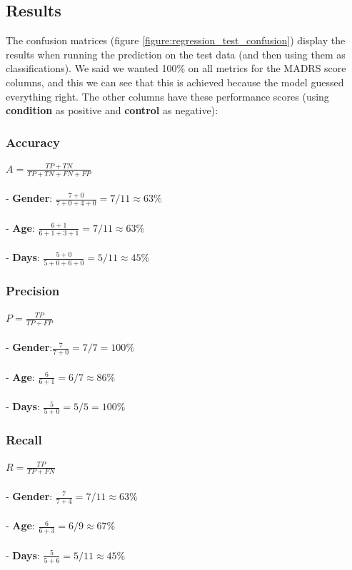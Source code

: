 \subsection{Results}

The confusion matrices (figure \ref{figure:regression_test_confusion}) display the results when running the prediction on the test data (and then using them as classifications). We said we wanted 100\% on all metrics for the MADRS score columns, and this we can see that this is achieved because the model guessed everything right. The other columns have these performance scores (using \textbf{condition} as positive and \textbf{control} as negative):

\subsubsection{Accuracy}
$ A = \frac{TP+TN}{TP+TN+FN+FP} $
\\\\
- \textbf{Gender}: $\frac{7+0}{7+0+4+0} = 7/11 \approx 63\%$\\\\
- \textbf{Age}: $\frac{6+1}{6+1+3+1} = 7/11 \approx 63\%$\\\\
- \textbf{Days}: $\frac{5+0}{5+0+6+0} = 5/11 \approx 45\%$\\

\subsubsection{Precision}
$ P = \frac{TP}{TP+FP} $
\\\\
- \textbf{Gender}:$ \frac{7}{7+0} = 7/7 = 100\%$\\\\
- \textbf{Age}: $\frac{6}{6+1} = 6/7 \approx 86\%$\\\\
- \textbf{Days}: $\frac{5}{5+0} = 5/5 = 100\%$\\

\subsubsection{Recall}
$ R = \frac{TP}{TP+FN} $
\\\\
- \textbf{Gender}: $\frac{7}{7+4} = 7/11 \approx 63\%$\\\\
- \textbf{Age}: $\frac{6}{6+3} = 6/9 \approx 67\%$\\\\
- \textbf{Days}: $\frac{5}{5+6} = 5/11 \approx 45\%$

